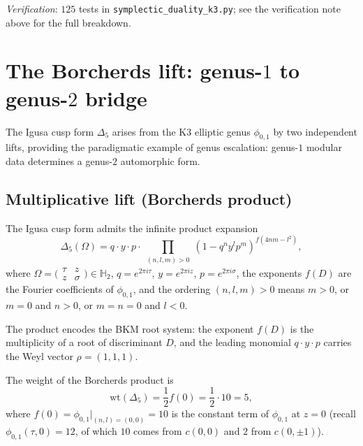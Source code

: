 \noindent\textit{Verification}: $125$ tests in
\texttt{symplectic\_duality\_k3.py}; see the verification note above
for the full breakdown.


\section{The Borcherds lift: genus-$1$ to genus-$2$ bridge}
\label{sec:k3e-borcherds-lift}

The Igusa cusp form $\Delta_5$ arises from the K3 elliptic genus $\phi_{0,1}$ by two independent lifts, providing the paradigmatic example of genus escalation: genus-$1$ modular data determines a genus-$2$ automorphic form.

\subsection{Multiplicative lift (Borcherds product)}
\label{subsec:k3e-mult-lift}

\begin{theorem}
\label{thm:k3e-borcherds-product}
\ClaimStatusProvedElsewhere
The Igusa cusp form admits the infinite product expansion
\[
 \Delta_5(\Omega) = q \cdot y \cdot p \cdot \prod_{\substack{(n,l,m) > 0}} (1 - q^n y^l p^m)^{f(4nm - l^2)},
\]
where $\Omega = \bigl(\begin{smallmatrix} \tau & z \\ z & \sigma \end{smallmatrix}\bigr) \in \mathbb{H}_2$, $q = e^{2\pi i \tau}$, $y = e^{2\pi i z}$, $p = e^{2\pi i \sigma}$, the exponents $f(D)$ are the Fourier coefficients of $\phi_{0,1}$, and the ordering $(n,l,m) > 0$ means $m > 0$, or $m = 0$ and $n > 0$, or $m = n = 0$ and $l < 0$.
\ClaimStatusProvedElsewhere
\end{theorem}

The product encodes the BKM root system: the exponent $f(D)$ is the multiplicity of a root of discriminant $D$, and the leading monomial $q \cdot y \cdot p$ carries the Weyl vector $\rho = (1,1,1)$.

\begin{proposition}
\label{prop:k3e-weight-formula}
The weight of the Borcherds product is
\[
 \mathrm{wt}(\Delta_5) = \frac{1}{2} f(0) = \frac{1}{2} \cdot 10 = 5,
\]
where $f(0) = \phi_{0,1}|_{(n,l)=(0,0)} = 10$ is the constant term of $\phi_{0,1}$ at $z = 0$ (recall $\phi_{0,1}(\tau, 0) = 12$, of which $10$ comes from $c(0,0)$ and $2$ from $c(0, \pm 1)$).
\ClaimStatusProvedElsewhere
\end{proposition}

